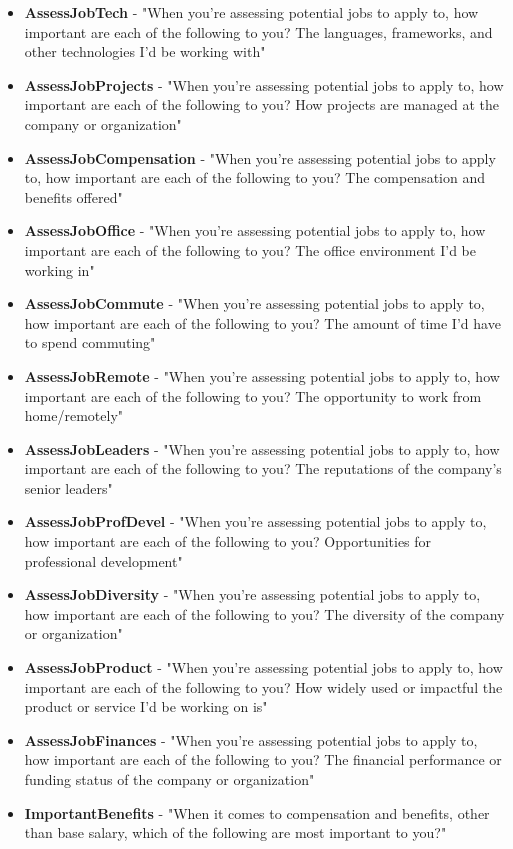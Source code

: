 \begin{appendices}
\begin{itemize}
        \item \textbf{AssessJobTech} - "When you're assessing potential jobs to apply to, how important are each of the following to you? The languages, frameworks, and other technologies I'd be working with"
        \item \textbf{AssessJobProjects} - "When you're assessing potential jobs to apply to, how important are each of the following to you? How projects are managed at the company or organization"
        \item \textbf{AssessJobCompensation} - "When you're assessing potential jobs to apply to, how important are each of the following to you? The compensation and benefits offered"
        \item \textbf{AssessJobOffice} - "When you're assessing potential jobs to apply to, how important are each of the following to you? The office environment I'd be working in"
        \item \textbf{AssessJobCommute} - "When you're assessing potential jobs to apply to, how important are each of the following to you? The amount of time I'd have to spend commuting"
        \item \textbf{AssessJobRemote} - "When you're assessing potential jobs to apply to, how important are each of the following to you? The opportunity to work from home/remotely"
        \item \textbf{AssessJobLeaders} - "When you're assessing potential jobs to apply to, how important are each of the following to you? The reputations of the company's senior leaders"
        \item \textbf{AssessJobProfDevel} - "When you're assessing potential jobs to apply to, how important are each of the following to you? Opportunities for professional development"
        \item \textbf{AssessJobDiversity} - "When you're assessing potential jobs to apply to, how important are each of the following to you? The diversity of the company or organization"
        \item \textbf{AssessJobProduct} - "When you're assessing potential jobs to apply to, how important are each of the following to you? How widely used or impactful the product or service I'd be working on is"
        \item \textbf{AssessJobFinances} - "When you're assessing potential jobs to apply to, how important are each of the following to you? The financial performance or funding status of the company or organization"
        \item \textbf{ImportantBenefits} - "When it comes to compensation and benefits, other than base salary, which of the following are most important to you?"

\end{itemize}
\end{appendices}
